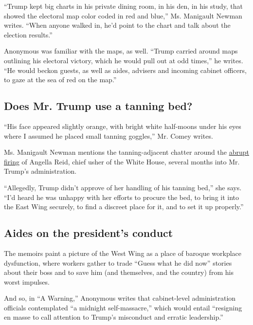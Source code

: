 ``Trump kept big charts in his private dining room, in his den, in his
study, that showed the electoral map color coded in red and blue,'' Ms.
Manigault Newman writes. ``When anyone walked in, he'd point to the
chart and talk about the election results.''

Anonymous was familiar with the maps, as well. ``Trump carried around
maps outlining his electoral victory, which he would pull out at odd
times,'' he writes. ``He would beckon guests, as well as aides, advisers
and incoming cabinet officers, to gaze at the sea of red on the map.''

\hypertarget{does-mr-trump-use-a-tanning-bed}{%
\subsection{Does Mr. Trump use a tanning
bed?}\label{does-mr-trump-use-a-tanning-bed}}

``His face appeared slightly orange, with bright white half-moons under
his eyes where I assumed he placed small tanning goggles,'' Mr. Comey
writes.

Ms. Manigault Newman mentions the tanning-adjacent chatter around the
\href{https://www.washingtonpost.com/news/post-politics/wp/2017/05/05/white-house-fires-its-chief-usher-the-first-woman-in-that-job/}{abrupt
firing} of Angella Reid, chief usher of the White House, several months
into Mr. Trump's administration.

``Allegedly, Trump didn't approve of her handling of his tanning bed,''
she says. ``I'd heard he was unhappy with her efforts to procure the
bed, to bring it into the East Wing securely, to find a discreet place
for it, and to set it up properly.''

\hypertarget{aides-on-the-presidents-conduct}{%
\subsection{Aides on the president's
conduct}\label{aides-on-the-presidents-conduct}}

The memoirs paint a picture of the West Wing as a place of baroque
workplace dysfunction, where workers gather to trade ``Guess what he did
now'' stories about their boss and to save him (and themselves, and the
country) from his worst impulses.

And so, in ``A Warning,'' Anonymous writes that cabinet-level
administration officials contemplated ``a midnight self-massacre,''
which would entail ``resigning en masse to call attention to Trump's
misconduct and erratic leadership.''

